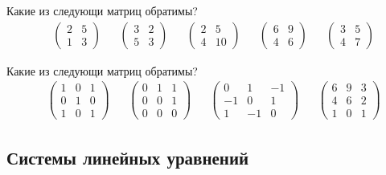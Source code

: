 \begin{exercise}
Какие из следующи матриц обратимы?
\begin{align*}
	& \begin{pmatrix}
		2 & 5 \\ 1 & 3
	\end{pmatrix} &
	& \begin{pmatrix}
		3 & 2 \\ 5 & 3
	\end{pmatrix} &
	& \begin{pmatrix}
		2 & 5 \\ 4 & 10
	\end{pmatrix} &
	& \begin{pmatrix}
		6 & 9 \\ 4 & 6
	\end{pmatrix} &
	& \begin{pmatrix}
		3 & 5 \\ 4 & 7
	\end{pmatrix}
\end{align*}
\end{exercise}

\begin{exercise}
Какие из следующи матриц обратимы?
\begin{align*}
		& \begin{pmatrix}
			1 & 0 & 1 \\ 0 & 1 & 0 \\ 1 & 0 & 1
		\end{pmatrix} &
		& \begin{pmatrix}
			0 & 1 & 1 \\ 0 & 0 & 1 \\ 0 & 0 & 0
		\end{pmatrix} &
		& \begin{pmatrix}
			0 & 1 & -1 \\ -1 & 0 & 1 \\ 1 & -1 & 0
		\end{pmatrix} &
		& \begin{pmatrix}
			6 & 9 & 3 \\ 4 & 6 & 2 \\ 1 & 0 & 1
		\end{pmatrix} 
\end{align*}
\end{exercise}

\subsection{Системы линейных уравнений}


